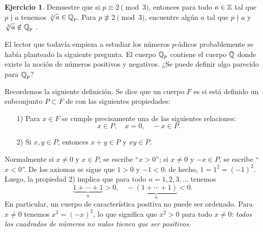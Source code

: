 \documentclass{article}
\numberwithin{equation}{section}
\theoremstyle{definition}
\newtheorem{ejerc}{Ejercicio}
\newif\ifsolutions
\begin{document}
\begin{ejerc}
  Demuestre que si $p \equiv 2 \pmod{3}$, entonces para todo $a\in\mathbb{Z}$ tal que
  $p\nmid a$ tenemos $\sqrt[3]{a} \in \mathbb{Q}_p$. Para $p\not\equiv 2 \pmod{3}$,
  encuentre algún $a$ tal que $p\nmid a$ y $\sqrt[3]{a} \notin \mathbb{Q}_p$ .

  \ifsolutions\begin{solucion}
    De nuevo, el lema de Hensel nos dice que las raíces cúbicas en
    $\ZZ_p^\times$ pueden ser levantadas de $\FF_p^\times$. La hipótesis
    $p \equiv 2 \pmod{3}$ implica que $3 \nmid (p-1) = \#\FF_p^\times$, así que
    para todo generador $a_0 \in \FF_p^\times$ el elemento $a_0^3$ es también
    un generador de $\FF_p^\times$, y $a \equiv a_0^{3n} = (a_0^n)^3 \pmod{p}$.

    Para $p = 7$ los cubos en $\FF_7^\times$ son $1$ y $6$. Por ejemplo,
    $\sqrt[3]{2} \notin \QQ_7$.
  \end{solucion}\fi
\end{ejerc}

El lector que todavía empieza a estudiar los números $p$-ádicos probablemente
se había planteado la siguiente pregunta. El cuerpo $\mathbb{Q}_p$ contiene el cuerpo
$\mathbb{Q}$ donde existe la noción de números positivos y negativos. ¿Se puede definir
algo parecido para $\mathbb{Q}_p$?

Recordemos la siguiente definición. Se dice que un cuerpo $F$ es 
si está definido un subconjunto $P\subset F$ de  con
las siguientes propiedades:

\begin{enumerate}
\item[1)] Para $x\in F$ se cumple precisamente una de las siguientes relaciones:
$$x\in P, \quad x = 0, \quad -x\in P.$$

\item[2)] Si $x,y\in P$, entonces $x+y \in P$ y $xy\in P$.
\end{enumerate}

Normalmente si $x\ne 0$ y $x\in P$, se escribe ``$x > 0$''; si $x\ne 0$
y $-x\in P$, se escribe ``$x < 0$''. De los axiomas se sigue que $1 > 0$
y $-1 < 0$: de hecho, $1 = 1^2 = (-1)^2$. Luego, la propiedad 2) implica que
para todo $n = 1,2,3,\ldots$ tenemos
$$\underbrace{1 + \cdots + 1}_n > 0, \quad -\underbrace{(1 + \cdots + 1)}_n < 0.$$
En particular, un cuerpo de característica positiva no puede ser ordenado.
Para $x\ne 0$ tenemos $x^2 = (-x)^2$, lo que significa que $x^2 > 0$ para todo
$x\ne 0$: \emph{todos los cuadrados de números no nulos tienen que ser
  positivos}.
\end{document}
